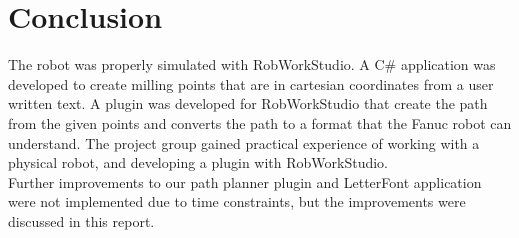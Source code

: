 \section{Conclusion}
\label{sec:conclusion}

The robot was properly simulated with RobWorkStudio. A C\# application was developed to create milling points that are in cartesian coordinates from a user written text. A plugin was developed for RobWorkStudio that create the path from the given points and converts the path to a format that the Fanuc robot can understand. The project group gained practical experience of working with a physical robot, and developing a plugin with RobWorkStudio. 
\\Further improvements to our path planner plugin and LetterFont application were not implemented due to time constraints, but the improvements were discussed in this report.
